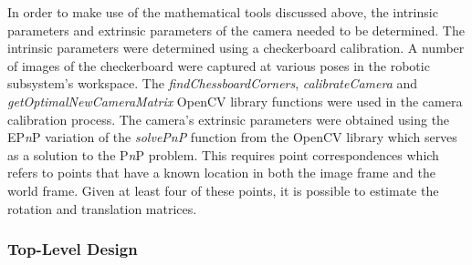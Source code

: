 %

In order to make use of the mathematical tools discussed above, the intrinsic parameters and extrinsic parameters of the camera needed to be determined. The intrinsic parameters were determined using a checkerboard calibration. A number of images of the checkerboard were captured at various poses in the robotic subsystem's workspace. The \textit{findChessboardCorners}, \textit{calibrateCamera} and \textit{getOptimalNewCameraMatrix} OpenCV library functions were used in the camera calibration process. The camera's extrinsic parameters were obtained using the EP\textit{n}P variation of the \textit{solvePnP} function from the OpenCV library which serves as a solution to the P\textit{n}P problem. This requires point correspondences which refers to points that have a known location in both the image frame and the world frame. Given at least four of these points, it is possible to estimate the rotation and translation matrices.


\subsubsection{Top-Level Design} \label{sec:Top-Level Design}

